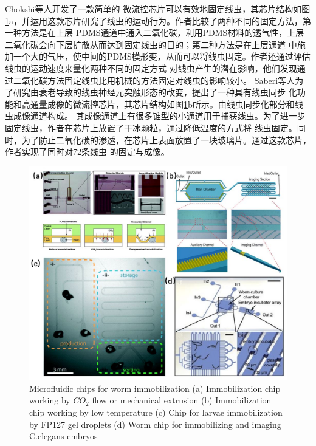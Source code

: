 	Chokshi等人\cite{Chokshi2009CO2}开发了一款简单的
	微流控芯片可以有效地固定线虫，其芯片结构如图\ref{fig:immobilization}a，并运用这款芯片研究了线虫的运动行为。作者比较了两种不同的固定方法，第一种方法是在上层
	PDMS通道中通入二氧化碳，利用PDMS材料的透气性，上层二氧化碳会向下层扩散从而达到固定线虫的目的；第二种方法是在上层通道
	中施加一个大的气压，使中间的PDMS模形变，从而可以将线虫固定。作者还通过评估线虫的运动速度来量化两种不同的固定方式
	对线虫产生的潜在影响，他们发现通过二氧化碳方法固定线虫比用机械的方法固定对线虫的影响较小。
	Saberi等人\cite{saberi2018microfluidic}为了研究由衰老导致的线虫神经元突触形态的改变，提出了一种具有线虫同步
	化功能和高通量成像的微流控芯片，其芯片结构如图\ref{fig:immobilization}b所示。由线虫同步化部分和线虫成像通道构成。
	其成像通道上有很多锥型的小通道用于捕获线虫。为了进一步固定线虫，作者在芯片上放置了干冰颗粒，通过降低温度的方式将
	线虫固定。同时，为了防止二氧化碳的渗透，在芯片上表面放置了一块玻璃片。通过这款芯片，作者实现了同时对72条线虫
	的固定与成像。
	\begin{figure}[t]
	  \centering
	  \includegraphics[width=12cm]{figure/chap1/immobilization.jpg}
		{Microfluidic chips for worm immobilization
		(a) Immobilization chip working by $CO_2$ flow or mechanical extrusion\cite{Chokshi2009CO2}
		(b) Immobilization chip working by low temperature\cite{saberi2018microfluidic}
		(c) Chip for larvae immobilization by FP127 gel droplets\cite{Aubry2015Hydrogel}
		(d) Worm chip for immobilizing and imaging C.elegans embryos\cite{Cornaglia2015An}
		}
	  \label{fig:immobilization}
	\end{figure}
	
